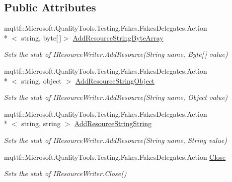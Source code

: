 \subsection*{Public Attributes}
\begin{DoxyCompactItemize}
\item 
mqttf\-::\-Microsoft.\-Quality\-Tools.\-Testing.\-Fakes.\-Fakes\-Delegates.\-Action\\*
$<$ string, byte\mbox{[}$\,$\mbox{]}$>$ \hyperlink{class_system_1_1_resources_1_1_fakes_1_1_stub_i_resource_writer_aa6a2c2949fe0e75f4265322607e1ee3f}{Add\-Resource\-String\-Byte\-Array}
\begin{DoxyCompactList}\small\item\em Sets the stub of I\-Resource\-Writer.\-Add\-Resource(\-String name, Byte\mbox{[}$\,$\mbox{]} value)\end{DoxyCompactList}\item 
mqttf\-::\-Microsoft.\-Quality\-Tools.\-Testing.\-Fakes.\-Fakes\-Delegates.\-Action\\*
$<$ string, object $>$ \hyperlink{class_system_1_1_resources_1_1_fakes_1_1_stub_i_resource_writer_a12f5f47f114cae6269c4c74de63d291d}{Add\-Resource\-String\-Object}
\begin{DoxyCompactList}\small\item\em Sets the stub of I\-Resource\-Writer.\-Add\-Resource(\-String name, Object value)\end{DoxyCompactList}\item 
mqttf\-::\-Microsoft.\-Quality\-Tools.\-Testing.\-Fakes.\-Fakes\-Delegates.\-Action\\*
$<$ string, string $>$ \hyperlink{class_system_1_1_resources_1_1_fakes_1_1_stub_i_resource_writer_a169fc515ecc0e9fbdc9c690b604bdafc}{Add\-Resource\-String\-String}
\begin{DoxyCompactList}\small\item\em Sets the stub of I\-Resource\-Writer.\-Add\-Resource(\-String name, String value)\end{DoxyCompactList}\item 
mqttf\-::\-Microsoft.\-Quality\-Tools.\-Testing.\-Fakes.\-Fakes\-Delegates.\-Action \hyperlink{class_system_1_1_resources_1_1_fakes_1_1_stub_i_resource_writer_a67bd6e57d9d573626a9c752bff9127ab}{Close}
\begin{DoxyCompactList}\small\item\em Sets the stub of I\-Resource\-Writer.\-Close()\end{DoxyCompactList}\item 

\end{DoxyCompactItemize}

